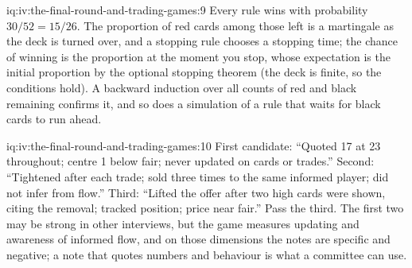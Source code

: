 \begin{solution}{iq:iv:the-final-round-and-trading-games:9}
Every rule wins with probability $30/52 = 15/26$. The proportion of red cards among those left is a
martingale as the deck is turned over, and a stopping rule chooses a stopping time; the chance of winning is
the proportion at the moment you stop, whose expectation is the initial proportion by the optional stopping
theorem (the deck is finite, so the conditions hold). A backward induction over all counts of red and black
remaining confirms it, and so does a simulation of a rule that waits for black cards to run ahead.
\end{solution}

\begin{solution}{iq:iv:the-final-round-and-trading-games:10}
First candidate: ``Quoted 17 at 23 throughout; centre 1 below fair; never updated on cards or trades.''
Second: ``Tightened after each trade; sold three times to the same informed player; did not infer from flow.''
Third: ``Lifted the offer after two high cards were shown, citing the removal; tracked position; price near
fair.'' Pass the third. The first two may be strong in other interviews, but the game measures updating and
awareness of informed flow, and on those dimensions the notes are specific and negative; a note that quotes
numbers and behaviour is what a committee can use.
\end{solution}
